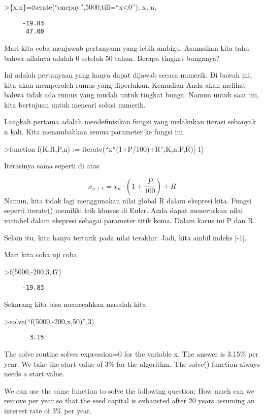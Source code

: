 \documentclass[
]{book}
\begin{document}
\textgreater\{x,n\}=iterate(``onepay'',5000,till=``x\textless0''); x, n,

\begin{verbatim}
     -19.83 
      47.00 
\end{verbatim}

Mari kita coba menjawab pertanyaan yang lebih ambigu. Asumsikan kita tahu bahwa nilainya adalah 0 setelah 50 tahun. Berapa tingkat bunganya?

Ini adalah pertanyaan yang hanya dapat dijawab secara numerik. Di bawah ini, kita akan memperoleh rumus yang diperlukan. Kemudian Anda akan melihat bahwa tidak ada rumus yang mudah untuk tingkat bunga. Namun untuk saat ini, kita bertujuan untuk mencari solusi numerik.

Langkah pertama adalah mendefinisikan fungsi yang melakukan iterasi sebanyak n kali. Kita menambahkan semua parameter ke fungsi ini.

\textgreater function f(K,R,P,n) := iterate(``x*(1+P/100)+R'',K,n;P,R){[}-1{]}

Iterasinya sama seperti di atas

\[x_{n+1} = x_n \cdot \left(1+ \frac{P}{100}\right) + R\]Namun, kita tidak lagi menggunakan nilai global R dalam ekspresi kita. Fungsi seperti iterate() memiliki trik khusus di Euler. Anda dapat meneruskan nilai variabel dalam ekspresi sebagai parameter titik koma. Dalam kasus ini P dan R.

Selain itu, kita hanya tertarik pada nilai terakhir. Jadi, kita ambil indeks {[}-1{]}.

Mari kita coba uji coba.

\textgreater f(5000,-200,3,47)

\begin{verbatim}
     -19.83 
\end{verbatim}

Sekarang kita bisa memecahkan masalah kita.

\textgreater solve(``f(5000,-200,x,50)'',3)

\begin{verbatim}
       3.15 
\end{verbatim}

The solve routine solves expression=0 for the variable x. The answer is 3.15\% per year. We take the start value of 3\% for the algorithm. The solve() function always needs a start value.

We can use the same function to solve the following question: How much can we remove per year so that the seed capital is exhausted after 20 years assuming an interest rate of 3\% per year.
\end{document}
